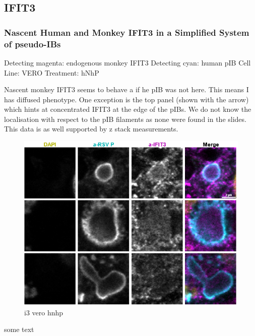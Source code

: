 \subsection{IFIT3} \label{IFIT3}
\subsubsection{Nascent Human and Monkey IFIT3 in a Simplified System of pseudo-IBs} \label{Nascent Human and Monkey IFIT3 in a Simplified System of pseudo-IBs}
Detecting magenta: endogenous monkey IFIT3 \newline
Detecting cyan: human pIB \newline
Cell Line: VERO \newline
Treatment: hNhP \newline

Nascent monkey IFIT3 seems to behave a if he pIB was not here. This means I has diffused phenotype. One exception is the top panel (shown with the arrow) which hints at concentrated IFIT3 at the edge of the pIBs. We do not know the localisation with respect to the pIB filaments as none were found in the slides. This data is as well supported by z stack measurements.

\begin{figure}
    \centering
    \includegraphics[width=1\linewidth]{08. Chapter 3/Figs/04. IFIT3/01. vero hnhp.png}
    \caption[i3 vero hnhp]{i3 vero hnhp}
    \label{i3 vero hnhp}
\end{figure}

some text

